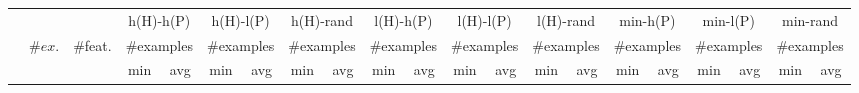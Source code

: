 \begin{tabular}{lccrrrrrrrrrrrrrrrrrr}
\toprule
& && \multicolumn{2}{c}{h(H)-h(P)} & \multicolumn{2}{c}{h(H)-l(P)} & \multicolumn{2}{c}{h(H)-rand} & \multicolumn{2}{c}{l(H)-h(P)} & \multicolumn{2}{c}{l(H)-l(P)} & \multicolumn{2}{c}{l(H)-rand} & \multicolumn{2}{c}{min-h(P)} & \multicolumn{2}{c}{min-l(P)} & \multicolumn{2}{c}{min-rand}\\
\cmidrule(rr){4-5}\cmidrule(rr){6-7}\cmidrule(rr){8-9}\cmidrule(rr){10-11}\cmidrule(rr){12-13}\cmidrule(rr){14-15}\cmidrule(rr){16-17}\cmidrule(rr){18-19}\cmidrule(rr){20-21}
&\multirow{2}{*}{$\#ex.$} & \multirow{2}{*}{\#feat.} &  \multicolumn{2}{c}{\#examples} & \multicolumn{2}{c}{\#examples} & \multicolumn{2}{c}{\#examples} & \multicolumn{2}{c}{\#examples} & \multicolumn{2}{c}{\#examples} & \multicolumn{2}{c}{\#examples} & \multicolumn{2}{c}{\#examples} & \multicolumn{2}{c}{\#examples} & \multicolumn{2}{c}{\#examples} \\\cmidrule(rl){4-5}\cmidrule(rl){6-7}\cmidrule(rl){8-9}\cmidrule(rl){10-11}\cmidrule(rl){12-13}\cmidrule(rl){14-15}\cmidrule(rl){16-17}\cmidrule(rl){18-19}\cmidrule(rl){20-21}
&& & \multicolumn{1}{c}{min} & \multicolumn{1}{c}{avg} & \multicolumn{1}{c}{min} & \multicolumn{1}{c}{avg} & \multicolumn{1}{c}{min} & \multicolumn{1}{c}{avg} & \multicolumn{1}{c}{min} & \multicolumn{1}{c}{avg} & \multicolumn{1}{c}{min} & \multicolumn{1}{c}{avg} & \multicolumn{1}{c}{min} & \multicolumn{1}{c}{avg} & \multicolumn{1}{c}{min} & \multicolumn{1}{c}{avg} & \multicolumn{1}{c}{min} & \multicolumn{1}{c}{avg} & \multicolumn{1}{c}{min} & \multicolumn{1}{c}{avg} \\
\midrule


\end{tabular}
